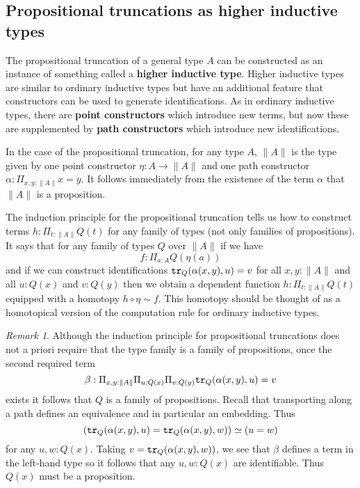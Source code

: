 \documentclass{amsart}
\theoremstyle{theorem}
\theoremstyle{definition}
\theoremstyle{remark}
\newtheorem*{rmk}{Remark}
\newcommand{\0}{\mathbbe{0}}
\newcommand{\1}{\mathbbe{1}}
\newcommand{\2}{\mathbbe{2}}
\newcommand{\3}{\mathbbe{3}}
\newcommand{\4}{\mathbbe{4}}
\newcommand{\term}[1]{{\textup{\texttt{#1}}}}
\newcommand{\tr}{\term{tr}}
\newcommand{\mere}[1]{\|{#1}\|}
\begin{document}
\subsection*{Propositional truncations as higher inductive types}

The propositional truncation of a general type $A$ can be constructed as an instance of something called a \textbf{higher inductive type}. Higher inductive types are similar to ordinary inductive types but have an additional feature that constructors can be used to generate identifications. As in ordinary inductive types, there are \textbf{point constructors} which introduce new terms, but now these are supplemented by \textbf{path constructors} which introduce new identifications.

In the case of the propositional truncation, for any type $A$, $\mere{A}$ is the type given by one point constructor $\eta \colon A \to \mere{A}$ and one path constructor $\alpha \colon \Pi_{x,y : \mere{A}} x= y$. It follows immediately from the existence of the term $\alpha$ that $\mere{A}$ is a proposition.

The induction principle for the propositional truncation tells us how to construct terms $h : \Pi_{t : \mere{A}} Q(t)$ for any family of types (not only families of propositions). It says that for any family of types $Q$ over $\mere{A}$ if we have
\[ f : \Pi_{a:A}Q(\eta(a))\] and if we can construct identifications $\tr_Q(\alpha(x,y),u)=v$ for all $x,y : \mere{A}$ and all $u : Q(x)$ and $v : Q(y)$ then we obtain a dependent function $h : \Pi_{t : \mere{A}}Q(t)$ equipped with a homotopy $h \circ \eta \sim f$. This homotopy should be thought of as a homotopical version of the computation rule for ordinary inductive types.

\begin{rmk} Although the induction principle for propositional truncations does not a priori require that the type family is a family of propositions, once the second required term
\[ \beta : \Pi_{x,y : \mere{A}} \Pi_{u : Q(x)} \Pi_{v : Q(y)} \tr_Q(\alpha(x,y),u)=v\] exists it follows that $Q$ is a family of propositions. Recall that transporting along a path defines an equivalence and in particular an embedding. Thus
\[ (\tr_Q(\alpha(x,y),u) = \tr_Q(\alpha(x,y),w)) \simeq (u=w)\] for any $u,w : Q(x)$. Taking $v  =  \tr_Q(\alpha(x,y),w))$, we see that $\beta$ defines a term in the left-hand type so it follows that any $u,w : Q(x)$ are identifiable. Thus $Q(x)$ must be a proposition.
\end{rmk}
\end{document}
